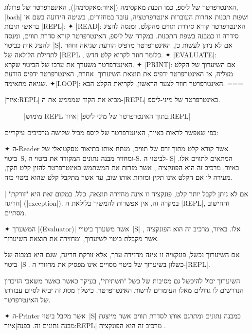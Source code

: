 \begin{minipage}{0.9\linewidth}
  \centering
  \footnotesize
\begin{mdframed}[backgroundcolor=Lavender!20]
    האינטרפרטר של ליספ, כמו תכנת מאקסימה (|איור:מאקסימה|), האינטרפרטר של
    פרולוג, \E|bash| ושפות תכנות אחרות העוברות אינטרפרטציה, עובד במחזורים,
    בשיטה הידועה בשם
    או בראשי תיבות \E|REPL|:
    ✦ \E|READ|: האינטרפרטר קורא סידרת תווים מהקלט, ומנסה להציג סידרה זו כמבנה
    בשפת התכנות. במקרה של ליספ, האינטרפרטר קורא סדרת תווים, ומנסה להציג
    אות כביטוי~\E|S|. אם לא ניתן לעשות כן, האינטרפרטר מדפיס הודעת שגיאה וחוזר
    לתחילת הלולאה של \E|REPL|, כלומר חוזר לקרוא קלט חדש.
    ✦ \E|EVALUATE|: האינטרפרטר משערך את ערכו של הביטוי שקרא.
    ✦ \E|PRINT|: אם השיערוך של הקלט מצליח, אז האינטרפרטר ידפיס את תוצאת
    השיערוך. אחרת, האינטרפרטר ידפיס הודעת שגיאה מתאימה.
    ✦\E|LOOP|: האינטרפרטר חוזר לצעד הראשון, לקריאת הקלט הבא.
===
  \end{mdframed}
\end{minipage}

|איור:REPL| מביא את הקוד שמממש את ה-\E|REPL| באינטרפרטר של מיני-ליספ.
\begin{figure}[H]
|מימוש REPL בתוך האינטרפרטר של מיני-ליספ|
|איור:REPL|

\end{figure}


כפי שאפשר לראות באיור, האינטרפרטר של ליספ מכיל שלושה מרכיבים עיקריים:
\begin{enumerate}

  ✦ ה-Reader אשר קורא קלט מתוך זרם של תווים, מנתח אותו כתיאור טסקטואלי של
  ביטוי~S, ומחזיר מבנה נתונים המקודד את ביטוי ה-S.  לביטוי ה-\E|S|
  המתאים
  לתווים אלו. באיור, מרכיב זה הוא הפונקציה ,
  אשר מזרזת את המשתמש באינטרפרטר להזין קלט תקין, מעירה לו אם הקלט אינו תקין
  ומזרזת אותו שוב, עד אשר מתקבל קלט שהוא ביטוי כזה.

  אם לא ניתן לקבל יותר קלט, פונקציה זו אינה מחזירה תוצאה, כלל. במקום זאת היא
  "זורקת" \ע|חריגה| (\E|exception|). במקרה זה, אין אפשרות להמשיך בלולאת
  ה-\E|REPL|, והחישוב מסתיים.

  ✦ המשערך \E|(Evaluator)| אשר משערך ביטויי~\E|S| אלו. באיור, מרכיב זה הוא
  הפונקציה , אשר מקבלת ביטוי לשיערוך, ומחזירה את תוצאת השיערוך.

  אם השיערוך נכשל, פונקציה זו אינה מחזירה ערך, אלא זורקת חריגה, שגם היא במבנה
  של ביטוי~\E|S|. כשלון בשיערוך של ביטוי מסויים אינו מפסיק את מחזורי
  ה-\E|REPL|.

  השיערוך יכול להיכשל גם מסיבות של כשל "תשתיתי", בעיקר כאשר כאשר משאבי הזיכרון
  הנדרשים לו גדולים מאלו העומדים לרשות האינטרפרטר. כישלון מסוג זה יביא לסיום עבודתו
  של האינטרפרטר.

  ✦ ה-Printer אשר מקבל ביטוי~\E|S| כמבנה נתונים ומתרגם אותו לסדרת תווים אשר
  מייצגת מבנה נתונים זה. בפנה|איור:REPL| מרכיב זה הוא הפונקציה .
\end{enumerate}

